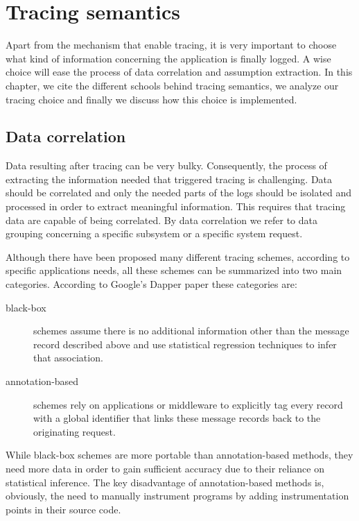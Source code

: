 \chapter{Tracing semantics}\label{ch:dapper-zipkin}

Apart from the mechanism that enable tracing, it is very important to choose
what kind of information concerning the application is finally logged. A wise
choice will ease the process of data correlation and assumption extraction. In
this chapter, we cite the different schools behind tracing semantics, we analyze
our tracing choice and finally we discuss how this choice is implemented.

\section{Data correlation}\label{sec:data-cor}

Data resulting after tracing can be very bulky. Consequently, the process of
extracting the information needed that triggered tracing is challenging. Data
should be correlated and only the needed parts of the logs should be isolated
and processed in order to extract meaningful information. This requires that
tracing data are capable of being correlated. By data correlation we refer to
data grouping concerning a specific subsystem or a specific system request.

Although there have been proposed many different tracing schemes, according to
specific applications needs, all these schemes can be summarized into two main
categories. According to Google's Dapper paper\cite{dapper} these categories
are:

\begin{description}

\item[black-box] schemes \cite{blackbox1, blackbox2} assume there is no
additional information other than the message record described above and use
statistical regression techniques to infer that association.

\item[annotation-based] schemes \cite{magpie, xtrace} rely on applications or
middleware to explicitly tag every record with a global identifier that links
these message records back to the originating request.

\end{description}

While black-box schemes are more portable than annotation-based methods, they
need more data in order to gain sufficient accuracy due to their reliance on
statistical inference. The key disadvantage of annotation-based methods is,
obviously, the need to manually instrument programs by adding instrumentation
points in their source code.

